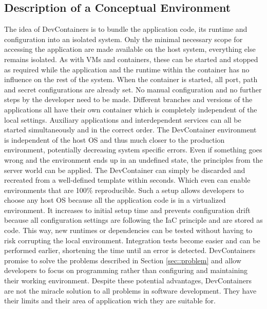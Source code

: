 \documentclass[12pt, a4paper]{article}
\begin{document}
    \subsection{Description of a Conceptual Environment}
    The idea of DevContainers is to bundle the application code, its runtime and configuration into an isolated system. Only the minimal necessary scope for accessing the application are made available on the host system, everything else remains isolated. As with \ac{VM}s and containers, these can be started and stopped as required while the application and the runtime within the container has no influence on the rest of the system. When the container is started, all port, path and secret configurations are already set. No manual configuration and no further steps by the developer need to be made. Different branches and versions of the applications all have their own container which is completely independent of the local settings. Auxiliary applications and interdependent services can all be started simultaneously and in the correct order. The DevContainer environment is independent of the host \ac{OS} and thus much closer to the production environment, potentially decreasing system specific errors. Even if something goes wrong and the environment ends up in an undefined state, the principles from the server world can be applied. The DevContainer can simply be discarded and recreated from a well-defined template within seconds. Which even can enable environments that are 100\% reproducible.\newline
    Such a setup allows developers to choose any host \acl{OS} because all the application code is in a virtualized environment. It increases to initial setup time and prevents configuration drift because all configuration settings are following the \ac{IaC} principle and are stored as code. This way, new runtimes or dependencies can be tested without having to risk corrupting the local environment. Integration tests become easier and can be performed earlier, shortening the time until an error is detected. DevContainers promise to solve the problems described in Section \ref{sec::problem} and allow developers to focus on programming rather than configuring and maintaining their working environment.\newline
    Despite these potential advantages, DevContainers are not the miracle solution to all problems in software development. They have their limits and their area of application wich they are suitable for.
\end{document}
